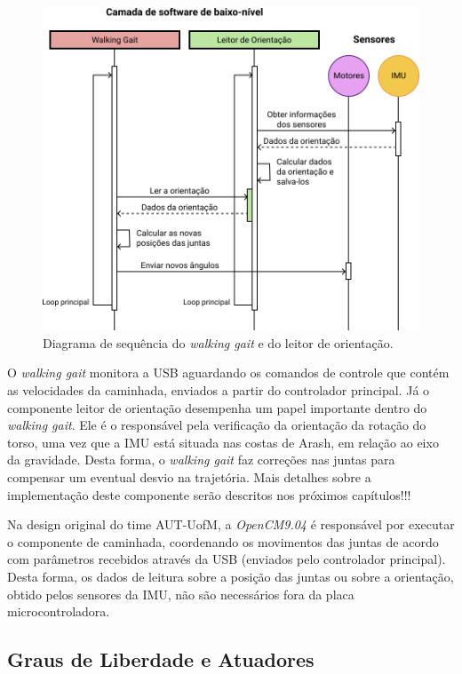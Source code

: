 \begin{figure}[h!]
	\centering
	\includegraphics[scale=1]{imagens/svg/softwarearchitecture-lowlevel}
	\caption{Diagrama de sequência do \textit{walking gait} e do leitor de orientação.}
	\label{fig:SoftwareArchitecture:LowLevel}
\end{figure}

O \textit{walking gait} monitora a USB aguardando os comandos de controle que contém as velocidades da caminhada, enviados a partir do controlador principal. Já o componente leitor de orientação desempenha um papel importante dentro do \textit{walking gait}. Ele é o responsável pela verificação da orientação da rotação do torso, uma vez que a IMU está situada nas costas de Arash, em relação ao eixo da gravidade. Desta forma, o \textit{walking gait} faz correções nas juntas para compensar um eventual desvio na trajetória. Mais detalhes sobre a implementação deste componente serão descritos nos próximos capítulos!!!

Na design original do time AUT-UofM, a \textit{OpenCM9.04} é responsável por executar o componente de caminhada, coordenando os movimentos das juntas de acordo com parâmetros recebidos através da USB (enviados pelo controlador principal). Desta forma, os dados de leitura sobre a posição das juntas ou sobre a orientação, obtido pelos sensores da IMU, não são necessários fora da placa microcontroladora.

\subsection{Graus de Liberdade e Atuadores}

